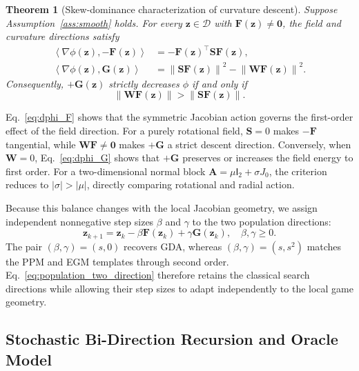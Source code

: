 \documentclass[journal]{IEEEtran}
\newtheorem{theorem}{Theorem}
\theoremstyle{remark}
\newcommand{\inner}[2]{\left\langle #1,#2\right\rangle}
\newcommand{\norm}[1]{\left\lVert #1\right\rVert}
\newcommand{\Id}{\mathsf{I}}
\newcommand{\cD}{\mathcal{D}}
\newcommand{\bz}{\boldsymbol{z}}
\newcommand{\bzero}{\boldsymbol{0}}
\newcommand{\bW}{\boldsymbol{W}}
\newcommand{\bS}{\boldsymbol{S}}
\newcommand{\bA}{\boldsymbol{A}}
\newcommand{\bF}{\boldsymbol{F}}
\newcommand{\bG}{\boldsymbol{G}}
\begin{document}
	\begin{theorem}[Skew-dominance characterization of curvature descent]\label{thm:skew_dominance}
		Suppose Assumption~\ref{ass:smooth} holds.
		For every $\bz\in\cD$ with $\bF(\bz)\neq\bzero$, the field and curvature directions satisfy
		\begin{align}
			\inner{\nabla\phi(\bz)}{-\bF(\bz)}
			&=-\bF(\bz)^\top\bS\bF(\bz),
			\label{eq:dphi_F}\\
			\inner{\nabla\phi(\bz)}{\bG(\bz)}
			&=\norm{\bS\bF(\bz)}^2-\norm{\bW\bF(\bz)}^2.
			\label{eq:dphi_G}
		\end{align}
		Consequently, $+\bG(\bz)$ strictly decreases $\phi$ if and only if
		\begin{equation}\label{eq:skew_dominance}
			\norm{\bW\bF(\bz)}
			>
			\norm{\bS\bF(\bz)}.
		\end{equation}
	\end{theorem}
	
	Eq.~\eqref{eq:dphi_F} shows that the symmetric Jacobian action governs the first-order effect of the field direction.
	For a purely rotational field, $\bS=0$ makes $-\bF$ tangential, while $\bW\bF\neq\bzero$ makes $+\bG$ a strict descent direction.
	Conversely, when $\bW=0$, Eq.~\eqref{eq:dphi_G} shows that $+\bG$ preserves or increases the field energy to first order.
	For a two-dimensional normal block $\bA=\mu\Id_2+\sigma J_0$, the criterion reduces to $\lvert\sigma\rvert>\lvert\mu\rvert$, directly comparing rotational and radial action.
	
	Because this balance changes with the local Jacobian geometry, we assign independent nonnegative step sizes $\beta$ and $\gamma$ to the two population directions:
	\begin{equation}\label{eq:population_two_direction}
		\bz_{k+1}
		=
		\bz_k-\beta\bF(\bz_k)+\gamma\bG(\bz_k),
		\quad
		\beta,\gamma\ge0.
	\end{equation}
	The pair $(\beta,\gamma)=(s,0)$ recovers GDA, whereas $(\beta,\gamma)=(s,s^2)$ matches the PPM and EGM templates through second order.
	Eq.~\eqref{eq:population_two_direction} therefore retains the classical search directions while allowing their step sizes to adapt independently to the local game geometry.
	
	\subsection{Stochastic Bi-Direction Recursion and Oracle Model}\label{subsec:oracle_model}
	
\end{document}
